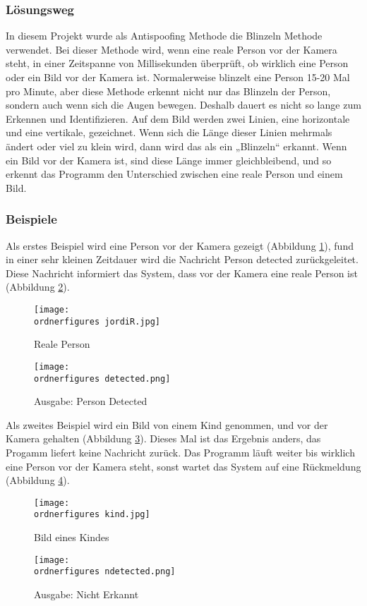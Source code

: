 \subsubsection{Lösungsweg}
In diesem Projekt wurde als Antispoofing Methode die Blinzeln Methode verwendet. Bei dieser Methode wird, wenn eine reale Person vor der Kamera steht, in einer Zeitspanne von Millisekunden überprüft, ob wirklich eine Person oder ein Bild vor der Kamera ist. Normalerweise blinzelt eine Person 15-20 Mal pro Minute, aber diese Methode erkennt nicht nur das Blinzeln der Person, sondern auch wenn sich die Augen bewegen. Deshalb dauert es nicht so lange zum Erkennen und Identifizieren.
Auf dem Bild werden zwei Linien, eine horizontale und eine vertikale, gezeichnet. Wenn sich die Länge dieser Linien mehrmals ändert oder viel zu klein wird, dann wird das als ein „Blinzeln“ erkannt. Wenn ein Bild vor der Kamera ist, sind diese Länge immer gleichbleibend, und so erkennt das Programm den Unterschied zwischen eine reale Person und einem Bild.
\newpage
\subsubsection{Beispiele}
Als erstes Beispiel wird eine Person vor der Kamera gezeigt (Abbildung \ref{fig:realep}),  fund in einer sehr kleinen Zeitdauer wird die Nachricht Person detected zurückgeleitet. Diese Nachricht informiert das System, dass vor der Kamera eine reale Person ist  (Abbildung \ref{fig:ausgabep}).\\
\begin{figure}[ht]
  \centering
    \texttt{[image: \\ordnerfigures jordiR.jpg]}
      \caption{Reale Person}
      \label{fig:realep}
\end{figure}
\begin{figure}[ht]
  \centering
    \texttt{[image: \\ordnerfigures detected.png]}
      \caption{Ausgabe: Person Detected}
      \label{fig:ausgabep}
\end{figure}

\newpage
Als zweites Beispiel wird ein Bild  von einem Kind genommen, und vor der Kamera gehalten (Abbildung \ref{fig:kindb}). Dieses Mal ist das Ergebnis anders, das Progamm liefert keine Nachricht zurück. Das Programm läuft weiter bis wirklich eine Person vor der Kamera steht, sonst wartet das System auf eine Rückmeldung (Abbildung \ref{fig:ausgabeb}).
\begin{figure}[ht]
  \centering
    \texttt{[image: \\ordnerfigures kind.jpg]}
      \caption{Bild eines Kindes}
      \label{fig:kindb}
\end{figure}
\begin{figure}[ht]
  \centering
    \texttt{[image: \\ordnerfigures ndetected.png]}
      \caption{Ausgabe: Nicht Erkannt}
      \label{fig:ausgabeb}
\end{figure}
